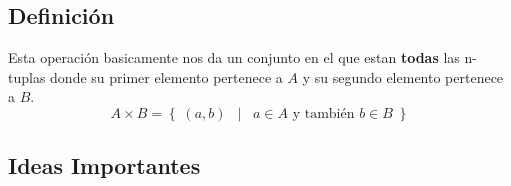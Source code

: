 \documentclass[12pt, fleqn]{report}                             %
\DeclareMathOperator \Space     {\quad}                         %
\DeclareMathOperator \MiniSpace {\;}                            %
\newcommand \Such           {\MiniSpace | \MiniSpace}           %
\theoremstyle{break}                                            %
\newcommand{\Set}[1]            {\left\{ \; #1 \; \right\}}     %
\begin{document}
            \clearpage
            \subsection*{Definición}

                Esta operación basicamente nos da un conjunto en el que estan \textbf{todas} las n-tuplas
                donde su primer elemento pertenece a $A$ y su segundo elemento pertenece a $B$.
                \begin{equation*}
                    A \times B = \Set{ (a, b) \Such a \in A \text{ y también } b \in B }
                \end{equation*}


            \subsection{Ideas Importantes}
\end{document}
